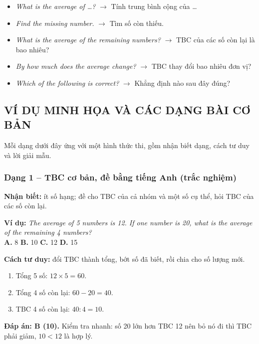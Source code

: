 \documentclass[../main.tex]{subfiles}
\begin{document}
\begin{itemize}
    \item \textit{What is the average of \dots?} $\to$ Tính trung bình cộng của \dots
    \item \textit{Find the missing number.} $\to$ Tìm số còn thiếu.
    \item \textit{What is the average of the remaining numbers?} $\to$ TBC của các số còn lại là bao nhiêu?
    \item \textit{By how much does the average change?} $\to$ TBC thay đổi bao nhiêu đơn vị?
    \item \textit{Which of the following is correct?} $\to$ Khẳng định nào sau đây đúng?
\end{itemize}

\subsection{VÍ DỤ MINH HỌA VÀ CÁC DẠNG BÀI CƠ BẢN}
Mỗi dạng dưới đây ứng với một hình thức thi, gồm nhận biết dạng, cách tư duy và lời giải mẫu.

\subsubsection{Dạng 1 -- TBC cơ bản, đề bằng tiếng Anh (trắc nghiệm)}
\textbf{Nhận biết:} ít số hạng; đề cho TBC của cả nhóm và một số cụ thể, hỏi TBC của các số còn lại.
\begin{vd}
    \textbf{Ví dụ:} \textit{The average of 5 numbers is 12. If one number is 20, what is the average of the remaining 4 numbers?}\\
    \textbf{A.} 8 \qquad \textbf{B.} 10 \qquad \textbf{C.} 12 \qquad \textbf{D.} 15
\end{vd}
\textbf{Cách tư duy:} đổi TBC thành tổng, bớt số đã biết, rồi chia cho số lượng mới.
\begin{enumerate}
    \item Tổng 5 số: $12 \times 5 = 60$.
    \item Tổng 4 số còn lại: $60 - 20 = 40$.
    \item TBC 4 số còn lại: $40 : 4 = 10$.
\end{enumerate}
\textbf{Đáp án: B (10).} Kiểm tra nhanh: số 20 lớn hơn TBC 12 nên bỏ nó đi thì TBC phải giảm, $10 < 12$ là hợp lý.
\end{document}
